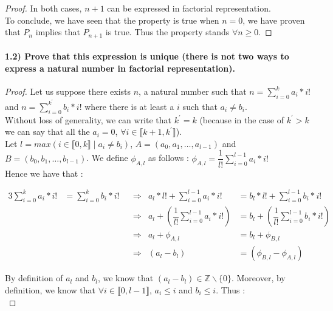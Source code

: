 \documentclass{article}
\begin{document}
\begin{proof}
  In both cases, $n+1$ can be expressed in factorial representation. \\

  To conclude, we have seen that the property is true when $n=0$, we have proven that $P_n$ implies that $P_{n+1}$ is true. Thus the property stands $\forall n \geq  0$.

\end{proof}

\paragraph{1.2) Prove that this expression is unique (there is not two ways to express a natural number in factorial representation).}

\begin{proof}

Let us suppose there exists $n$, a natural number such that $n = \displaystyle\sum_{i=0}^k a_i*i!$ and $n = \displaystyle\sum_{i=0}^{k^\prime} b_i*i!$ where there is at least a $i$ such that $a_i \ne b_i$. \\

Without loss of generality, we can write that $k^\prime = k$ (because in the case of $k^\prime > k$ we can say that all the $a_i=0$, $ \forall i \in \llbracket k+1, k^\prime\rrbracket$). \\

Let $l=max(i \in \llbracket 0, k\rrbracket \mid a_i \ne b_i)$, $A=(a_0, a_1, \dots , a_{l-1})$ and $B=(b_0, b_1, \dots , b_{l-1})$. We define $\phi_{A, l}$ as follows : $\phi_{A, l} = \dfrac{1}{l!}\displaystyle\sum_{i=0}^{l-1} a_i*i!$\\

Hence we have that :

\begin{alignat*}{3}
  \displaystyle\sum_{i=0}^k a_i*i! &= \displaystyle\sum_{i=0}^{k} b_i*i! & &\Rightarrow {} & a_l*l! + \displaystyle\sum_{i=0}^{l-1} a_i*i! &= b_l*l! + \displaystyle\sum_{i=0}^{l-1} b_i*i! \\
  & & &\Rightarrow  & a_l + (\dfrac{1}{l!}\displaystyle\sum_{i=0}^{l-1} a_i*i!) &= b_l + (\dfrac{1}{l!}\displaystyle\sum_{i=0}^{l-1} b_i*i!) \\
  & & &\Rightarrow  & a_l + \phi_{A, l} &= b_l + \phi_{B, l} \\
  & & &\Rightarrow  & (a_l-b_l) &= (\phi_{B, l}-\phi_{A, l})
\end{alignat*}

By definition of $a_l$ and $b_l$, we know that $(a_l-b_l) \in \mathbb{Z}\backslash \{0\}$. Moreover, by definition, we know that $\forall i \in \llbracket 0, l-1\rrbracket$, $a_i \leq i$ and $b_i \leq i$. Thus :\\


\end{proof}
\end{document}

